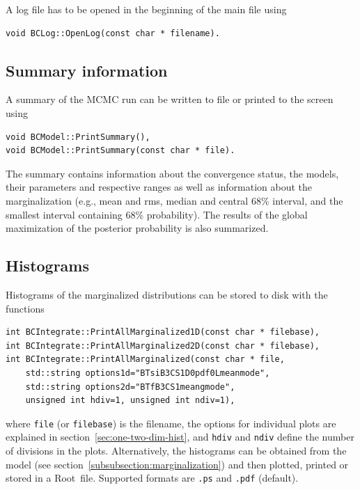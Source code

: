 \documentclass[11pt, a4paper]{article}
\newcommand{\Root}{{\sc Root}}
\begin{document}
A log file has to be opened in the beginning of the main file using
%
\begin{verbatim}
void BCLog::OpenLog(const char * filename).
\end{verbatim}


\subsection{Summary information}

A summary of the MCMC run can be written to file or printed to the
screen using
%
\begin{verbatim}
void BCModel::PrintSummary(),
void BCModel::PrintSummary(const char * file).
\end{verbatim}

The summary contains information about the convergence status, the
models, their parameters and respective ranges as well as information
about the marginalization (e.g., mean and rms, median and central 68\%
interval, and the smallest interval containing 68\% probability). The
results of the global maximization of the posterior probability is
also summarized.


\subsection{Histograms}

Histograms of the marginalized distributions can be stored to disk
with the functions
%
\begin{verbatim}
int BCIntegrate::PrintAllMarginalized1D(const char * filebase),
int BCIntegrate::PrintAllMarginalized2D(const char * filebase),
int BCIntegrate::PrintAllMarginalized(const char * file,
    std::string options1d="BTsiB3CS1D0pdf0Lmeanmode",
    std::string options2d="BTfB3CS1meangmode",
    unsigned int hdiv=1, unsigned int ndiv=1),
\end{verbatim}
%
where \verb|file| (or \verb|filebase|) is the filename, the options
for individual plots are explained in
section~\ref{sec:one-two-dim-hist}, and \verb|hdiv| and \verb|ndiv|
define the number of divisions in the plots. Alternatively, the
histograms can be obtained from the model (see
section~\ref{subsubsection:marginalization}) and then plotted, printed
or stored in a \Root\ file. Supported formats are \verb|.ps| and
\verb|.pdf| (default).
\end{document}
